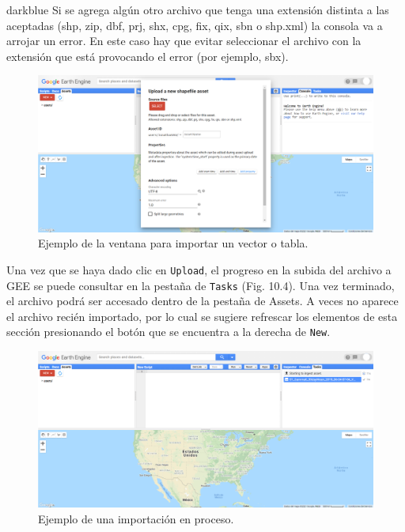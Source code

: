 \documentclass[
  12pt,
  letterpaper,
  twoside]{book}
\begin{document}
\begin{bluebox2}

\begin{awesomeblock}{5pt}{\faLightbulb}{darkblue}
Si se agrega algún otro archivo que tenga una extensión distinta a las aceptadas (shp, zip, dbf, prj, shx, cpg, fix, qix, sbn o shp.xml) la consola va a arrojar un error. En este caso hay que evitar seleccionar el archivo con la extensión que está provocando el error (por ejemplo, sbx).

\end{awesomeblock}

\end{bluebox2}

\begin{figure}[btp]

{\centering \includegraphics[width=1\linewidth]{Img/Asset2} 

}

\caption{Ejemplo de la ventana para importar un vector o tabla.}\label{fig:unnamed-chunk-176}
\end{figure}

Una vez que se haya dado clic en \texttt{Upload}, el progreso en la subida del archivo a GEE se puede consultar en la pestaña de \texttt{Tasks} (Fig. 10.4). Una vez terminado, el archivo podrá ser accesado dentro de la pestaña de Assets. A veces no aparece el archivo recién importado, por lo cual se sugiere refrescar los elementos de esta sección presionando el botón que se encuentra a la derecha de \texttt{New}.

\begin{figure}[btp]

{\centering \includegraphics[width=1\linewidth]{Img/Asset3} 

}

\caption{Ejemplo de una importación en proceso.}\label{fig:unnamed-chunk-177}
\end{figure}
\end{document}
